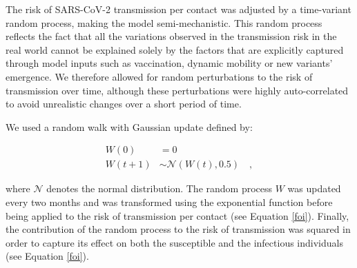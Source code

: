 The risk of SARS-CoV-2 transmission per contact was adjusted by a time-variant random process, making
the model semi-mechanistic. This random process reflects the fact that all the variations observed in the transmission
risk in the real world cannot be explained solely by the factors that are explicitly captured through model inputs such as vaccination, dynamic mobility or new variants' emergence.
We therefore allowed for random perturbations to the risk of transmission over time, although these perturbations were highly auto-correlated
to avoid unrealistic changes over a short period of time.

We used a random walk with Gaussian update defined by:

\begin{equation}
    \label{eq:random_process}
    \begin{split}
    W(0) & = 0 \\
    W(t+1) & \sim \mathcal{N}(W(t), 0.5) \quad ,
    \end{split}
\end{equation}

where $\mathcal{N}$ denotes the normal distribution.
The random process $W$ was updated every two months and was transformed using the exponential function before being applied to the risk of transmission per contact (see Equation \ref{foi}).
Finally, the contribution of the random process to the risk of transmission was squared in order to capture its effect
on both the susceptible and the infectious individuals (see Equation \ref{foi}). 